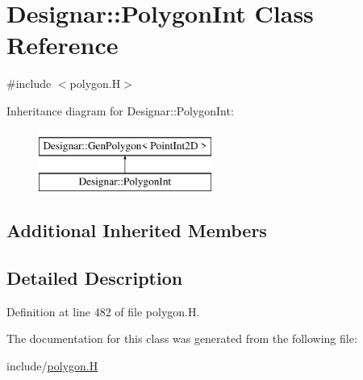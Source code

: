 \hypertarget{class_designar_1_1_polygon_int}{}\section{Designar\+:\+:Polygon\+Int Class Reference}
\label{class_designar_1_1_polygon_int}


{\ttfamily \#include $<$polygon.\+H$>$}

Inheritance diagram for Designar\+:\+:Polygon\+Int\+:\begin{figure}[H]
\begin{center}
\leavevmode
\includegraphics[height=2.000000cm]{class_designar_1_1_polygon_int}
\end{center}
\end{figure}
\subsection*{Additional Inherited Members}


\subsection{Detailed Description}


Definition at line 482 of file polygon.\+H.



The documentation for this class was generated from the following file\+:\begin{DoxyCompactItemize}
\item 
include/\hyperlink{polygon_8_h}{polygon.\+H}\end{DoxyCompactItemize}
